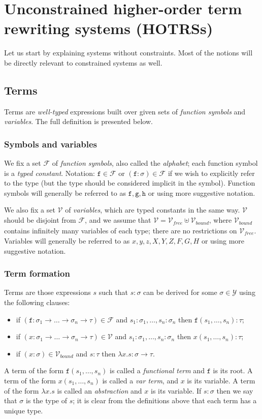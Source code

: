 \documentclass{lmcs}
\theoremstyle{theorem}\newtheorem{theorem}{Theorem}
\theoremstyle{theorem}\newtheorem{lemma}[theorem]{Lemma}
\theoremstyle{theorem}\newtheorem{corollary}[theorem]{Corollary}
\theoremstyle{definition}\newtheorem{definition}[theorem]{Definition}
\theoremstyle{definition}\newtheorem{example}[theorem]{Example}
\newcommand{\F}{\mathcal{F}}
\newcommand{\V}{\mathcal{V}}
\newcommand{\Vfree}{\mathcal{V}_{\mathit{free}}}
\newcommand{\Vbound}{\mathcal{V}_{\mathit{bound}}}
\newcommand{\Types}{\mathcal{Y}}
\newcommand{\atype}{\sigma}
\newcommand{\btype}{\tau}
\newcommand{\identifier}[1]{\mathtt{#1}}
\newcommand{\afun}{\identifier{f}}
\newcommand{\bfun}{\identifier{g}}
\newcommand{\cfun}{\identifier{h}}
\newcommand{\avar}{x}
\newcommand{\bvar}{y}
\newcommand{\cvar}{z}
\newcommand{\Avar}{X}
\newcommand{\Bvar}{Y}
\newcommand{\Cvar}{Z}
\newcommand{\AFvar}{F}
\newcommand{\BFvar}{G}
\newcommand{\CFvar}{H}
\newcommand{\abs}[2]{\lambda #1.#2}
\newcommand{\arrtype}{\rightarrow}
\newcommand{\mysubsection}[1]{\vspace{-12pt}\subsubsection{#1}}
\begin{document}
\section{Unconstrained higher-order term rewriting systems (HOTRSs)}

Let us start by explaining systems without constraints. Most of the notions will be directly
relevant to constrained systems as well.

\subsection{Terms}
Terms are \emph{well-typed} expressions built over given sets of \emph{function symbols} and
\emph{variables}. The full definition is presented below.

\mysubsection{Symbols and variables}

We fix a set $\F$ of \emph{function symbols}, also called the \emph{alphabet}; each function symbol
is a \emph{typed constant}. Notation: $\afun \in \F$ or $(\afun : \atype) \in \F$ if we wish to
explicitly refer to the type (but the type should be considered implicit in the symbol).
Function symbols will generally be referred to as $\afun,\bfun,\cfun$ or using more suggestive
notation.

We also fix a set $\V$ of \emph{variables}, which are typed constants in the same way.  $\V$ should
be disjoint from $\F$, and we assume that $\V = \Vfree \uplus \Vbound$, where $\Vbound$ contains
infinitely many variables of each type; there are no restrictions on $\Vfree$.
Variables will generally be referred to as $\avar,\bvar,\cvar,\Avar,\Bvar,\Cvar,\AFvar,\BFvar,
\CFvar$ or using more suggestive notation.

\mysubsection{Term formation}

Terms are those expressions $s$ such that $s : \atype$ can be derived for some $\atype \in \Types$
using the following clauses:
\begin{itemize}
\item if $(\afun : \atype_1 \arrtype \dots \arrtype \atype_n \arrtype \btype) \in \F$ and
  $s_1 : \atype_1,\dots,s_n : \atype_n$ then $\afun(s_1,\dots,s_n) : \btype$;
\item if $(\avar : \atype_1 \arrtype \dots \arrtype \atype_n \arrtype \btype) \in \V$ and
  $s_1 : \atype_1,\dots,s_n : \atype_n$ then $\avar(s_1,\dots,s_n) : \btype$;
\item if $(\avar : \atype) \in \Vbound$ and $s : \btype$ then $\abs{\avar}{s} : \atype \arrtype
  \btype$.
\end{itemize}
A term of the form $\afun(s_1,\dots,s_n)$ is called a \emph{functional term} and $\afun$ is its
root.
A term of the form $\avar(s_1,\dots,s_n)$ is called a \emph{var term}, and $\avar$ is its variable.
A term of the form $\abs{\avar}{s}$ is called an \emph{abstraction} and $\avar$ is its variable.
If $s : \atype$ then we say that $\atype$ is the type of $s$; it is clear from the definitions
above that each term has a unique type.
\end{document}
